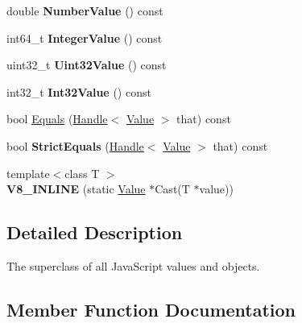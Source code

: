 \begin{DoxyCompactItemize}
\item 
\hypertarget{classv8_1_1_value_a4634d525bae654cdc50c398bfaee11aa}{}double {\bfseries Number\+Value} () const \label{classv8_1_1_value_a4634d525bae654cdc50c398bfaee11aa}

\item 
\hypertarget{classv8_1_1_value_ac61c74a94dea10f48a64f5906b6dd43d}{}int64\+\_\+t {\bfseries Integer\+Value} () const \label{classv8_1_1_value_ac61c74a94dea10f48a64f5906b6dd43d}

\item 
\hypertarget{classv8_1_1_value_af25557359e6bb79436ed60df18703d66}{}uint32\+\_\+t {\bfseries Uint32\+Value} () const \label{classv8_1_1_value_af25557359e6bb79436ed60df18703d66}

\item 
\hypertarget{classv8_1_1_value_a24daae9d99d02ff2e24b60287dcd4d95}{}int32\+\_\+t {\bfseries Int32\+Value} () const \label{classv8_1_1_value_a24daae9d99d02ff2e24b60287dcd4d95}

\item 
bool \hyperlink{classv8_1_1_value_adc2a7a92a120675bbd4c992163a20869}{Equals} (\hyperlink{classv8_1_1_handle}{Handle}$<$ \hyperlink{classv8_1_1_value}{Value} $>$ that) const 
\item 
\hypertarget{classv8_1_1_value_abb564818715b818957adc97716a076ba}{}bool {\bfseries Strict\+Equals} (\hyperlink{classv8_1_1_handle}{Handle}$<$ \hyperlink{classv8_1_1_value}{Value} $>$ that) const \label{classv8_1_1_value_abb564818715b818957adc97716a076ba}

\item 
\hypertarget{classv8_1_1_value_ae2b6c816081fe138d077cb9c166ea6e7}{}{\footnotesize template$<$class T $>$ }\\{\bfseries V8\+\_\+\+I\+N\+L\+I\+N\+E} (static \hyperlink{classv8_1_1_value}{Value} $\ast$Cast(T $\ast$value))\label{classv8_1_1_value_ae2b6c816081fe138d077cb9c166ea6e7}

\end{DoxyCompactItemize}


\subsection{Detailed Description}
The superclass of all Java\+Script values and objects. 

\subsection{Member Function Documentation}
\hypertarget{classv8_1_1_value_adc2a7a92a120675bbd4c992163a20869}{}
